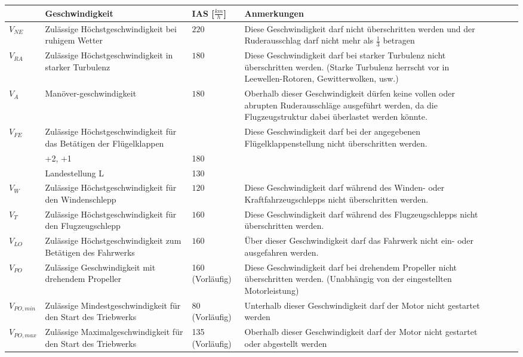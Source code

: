 \begin{longtable}{|p{}|m{}|p{}|m{}|llll}
\hline
& Geschwindigkeit & IAS [$\unit{\frac{km}{h}}$] & Anmerkungen \\
\hline
$V_{NE}$ & Zulässige Höchstgeschwindigkeit bei ruhigem Wetter & $220$ & Diese Geschwindigkeit darf nicht überschritten werden und der Ruderausschlag darf nicht mehr als $\frac{1}{3}$ betragen\\
\hline
$V_{RA}$ & Zulässige Höchstgeschwindigkeit in starker Turbulenz & $180$ & Diese Geschwindigkeit darf bei starker Turbulenz nicht überschritten werden. (Starke Turbulenz herrscht vor in Leewellen-Rotoren, Gewitterwolken, usw.) \\
\hline
$V_A$ & Manöver-\newline geschwindigkeit & $180$ & Oberhalb dieser Geschwindigkeit dürfen keine vollen oder abrupten Ruderausschläge ausgeführt werden, da die Flugzeugstruktur dabei überlastet werden könnte.\\
\hline
$V_{FE}$ & Zulässige Höchstgeschwindigkeit für das Betätigen der Flügelklappen
&   & Diese Geschwindigkeit darf bei der angegebenen Flügelklappenstellung nicht überschritten werden.\\
& +2, +1 & 180 & \\
& Landestellung L & 130 & \\
\hline
$V_W$ & Zulässige Höchstgeschwindigkeit für den Windenschlepp & $120$ & Diese Geschwindigkeit darf während des Winden- oder Kraftfahrzeugschlepps nicht überschritten werden.\\
\hline
$V_T$ & Zulässige Höchstgeschwindigkeit für den Flugzeugschlepp & $160$ & Diese Geschwindigkeit darf während des Flugzeugschlepps nicht überschritten werden.\\
\hline
$V_{LO}$ & Zulässige Höchstgeschwindigkeit zum Betätigen des Fahrwerks & $160$ & Über dieser Geschwindigkeit darf das Fahrwerk nicht ein- oder ausgefahren werden.\\
\hline
$V_{PO}$ & Zulässige Geschwindigkeit mit drehendem Propeller & 160 (Vorläufig) & Diese Geschwindigkeit darf bei drehendem Propeller nicht überschritten werden. (Unabhängig von der eingestellten Motorleistung)\\
\hline
$V_{PO,min}$ & Zulässige Mindestgeschwindigkeit für den Start des Triebwerks & 80 (Vorläufig) & Unterhalb dieser Geschwindigkeit darf der Motor nicht gestartet werden\\
\hline
$V_{PO,max}$ & Zulässige Maximalgeschwindigkeit für den Start des Triebwerks & 135 (Vorläufig) & Oberhalb dieser Geschwindigkeit darf der Motor nicht gestartet oder abgestellt werden\\
\hline
\end{longtable}


